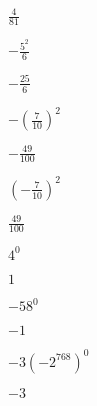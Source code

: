 \begin{essentialskills}
\begin{problem}
\begin{multicols}{4}
\begin{subproblem}
\begin{shortsolution}
				$\frac{4}{81}$ 
			\end{shortsolution}
		\end{subproblem}
		\begin{subproblem}
			$-\frac{5^2}{6}$ 
			\begin{shortsolution}
				$-\frac{25}{6}$ 
			\end{shortsolution}
		\end{subproblem}
		\begin{subproblem}
			$-\left( \frac{7}{10} \right)^2$ 
			\begin{shortsolution}
				$-\frac{49}{100}$ 
			\end{shortsolution}
		\end{subproblem}
		\begin{subproblem}
			$\left(- \frac{7}{10} \right)^2$ 
			\begin{shortsolution}
				$\frac{49}{100}$ 
			\end{shortsolution}
		\end{subproblem}
		\begin{subproblem}
			$4^0$ 
			\begin{shortsolution}
				$1$ 
			\end{shortsolution}
		\end{subproblem}
		\begin{subproblem}
			$-58^0$ 
			\begin{shortsolution}
				$-1$ 
			\end{shortsolution}
		\end{subproblem}
		\begin{subproblem}
			$-3\left( -2^{768} \right)^0$ 
			\begin{shortsolution}
				$-3$ 
			\end{shortsolution}
		\end{subproblem}
	\end{multicols}
	\end{problem}
\end{essentialskills}
